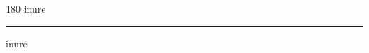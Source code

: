 
\begin{frame}
\begin{center}
\begin{turn}{180}
{\fontsize{2.5cm}{1em}\selectfont inure}
\end{turn}
\vspace{1em}\par  
\hrule
\vspace{1em}\par  
{\fontsize{2.5cm}{1em}\selectfont inure}
\end{center}
\end{frame}
